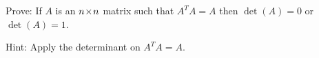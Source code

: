 
\begin{Exercise}[
name={},
title={}, 
difficulty=0,
origin={\cite{YL}}]
Prove: If $A$ is an $n \! \times \! n$ matrix such that $A^TA=A$ then $\det(A)=0$ or $\det(A)=1$.
\end{Exercise}

\begin{Answer}
Hint: Apply the determinant on $A^TA=A$.
\end{Answer}
